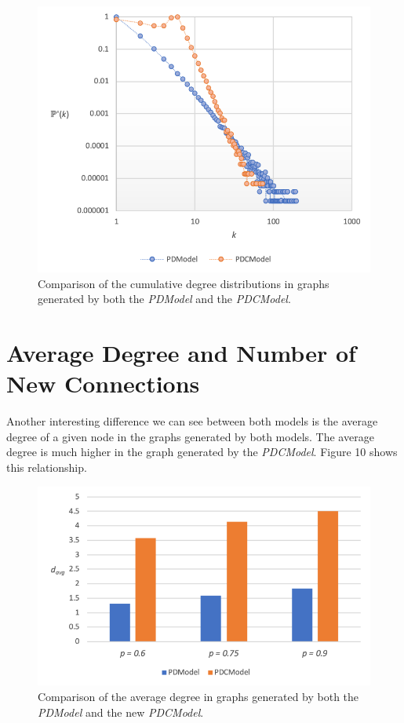 \documentclass[final,3p,times,twocolumn]{elsarticle}
\begin{document}
\begin{figure}[h]
\centering\includegraphics[width=1\linewidth]{cumulative-distribution-comparison.png}
\caption{Comparison of the cumulative degree distributions in graphs generated by both the \textit{PDModel} and the \textit{PDCModel}.}
\end{figure}

\section{Average Degree and Number of New Connections}
\label{S:9}

Another interesting difference we can see between both models is the average degree of a given node in the graphs generated by both models. The average degree is much higher in the graph generated by the \textit{PDCModel}. Figure 10 shows this relationship.

\begin{figure}[h]
\centering\includegraphics[width=1\linewidth]{average-degree-comparison.png}
\caption{Comparison of the average degree in graphs generated by both the \textit{PDModel} and the new \textit{PDCModel}.}
\end{figure}
\end{document}

